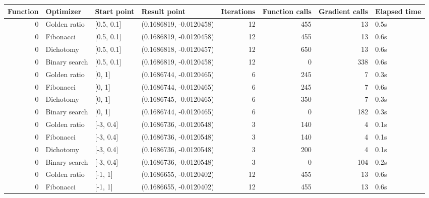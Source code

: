 \documentclass{article}
\begin{document}
    \begin{tabular}{rlllrrrl}
\toprule
 Function &      Optimizer & Start point &              Result point &  Iterations &  Function calls &  Gradient calls & Elapsed time \\
\midrule
        0 &   Golden ratio &  [0.5, 0.1] &   (0.1686819, -0.0120458) &          12 &             455 &              13 &         0.5s \\
        0 &      Fibonacci &  [0.5, 0.1] &   (0.1686819, -0.0120458) &          12 &             455 &              13 &         0.6s \\
        0 &      Dichotomy &  [0.5, 0.1] &   (0.1686818, -0.0120457) &          12 &             650 &              13 &         0.6s \\
        0 &  Binary search &  [0.5, 0.1] &   (0.1686819, -0.0120458) &          12 &               0 &             338 &         0.6s \\
        0 &   Golden ratio &      [0, 1] &   (0.1686744, -0.0120465) &           6 &             245 &               7 &         0.3s \\
        0 &      Fibonacci &      [0, 1] &   (0.1686744, -0.0120465) &           6 &             245 &               7 &         0.6s \\
        0 &      Dichotomy &      [0, 1] &   (0.1686745, -0.0120465) &           6 &             350 &               7 &         0.3s \\
        0 &  Binary search &      [0, 1] &   (0.1686744, -0.0120465) &           6 &               0 &             182 &         0.3s \\
        0 &   Golden ratio &   [-3, 0.4] &   (0.1686736, -0.0120548) &           3 &             140 &               4 &         0.1s \\
        0 &      Fibonacci &   [-3, 0.4] &   (0.1686736, -0.0120548) &           3 &             140 &               4 &         0.1s \\
        0 &      Dichotomy &   [-3, 0.4] &   (0.1686736, -0.0120548) &           3 &             200 &               4 &         0.1s \\
        0 &  Binary search &   [-3, 0.4] &   (0.1686736, -0.0120548) &           3 &               0 &             104 &         0.2s \\
        0 &   Golden ratio &     [-1, 1] &   (0.1686655, -0.0120402) &          12 &             455 &              13 &         0.6s \\
        0 &      Fibonacci &     [-1, 1] &   (0.1686655, -0.0120402) &          12 &             455 &              13 &         0.6s \\

\end{tabular}
\end{document}
